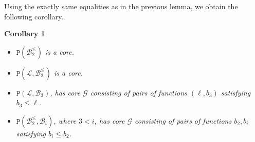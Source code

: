 \documentclass{amsart}
\numberwithin{equation}{section}
\theoremstyle{plain}
\newtheorem{corollary}[theorem]{Corollary}
\theoremstyle{definition}
\def\clone#1{\mathcal{#1}}
\def\minion#1{\mathcal{#1}}
\def\Bc{\clone{B}}
\def\Lc{\clone{L}}
\def\C#1{{\mathtt{P}}(#1)}
\begin{document}
Using the exactly same equalities as in the previous lemma, we obtain the following corollary.

\begin{corollary}\label{lb2leqbicor}
  \hfill
    \begin{itemize}
        \item $\C{\Bc_2^\leq}$ is a core.  
        \item $\C{\Lc, \Bc_2^\leq}$ is a core.
        \item $\C{\Lc, \Bc_3}$, has core $\minion{G}$ consisting of pairs of functions $(\ell, b_3)$ satisfying $b_3\leq \ell$.
        \item $\C{\Bc_2^\leq, \Bc_i}$, where $3<i$, has core $\minion{G}$ consisting of pairs of functions $b_2, b_i$ satisfying $b_i\leq b_2$.
    \end{itemize}
\end{corollary}
\end{document}

